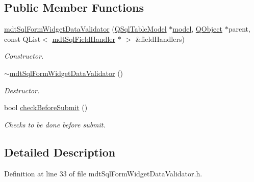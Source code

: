 \subsection*{Public Member Functions}
\begin{DoxyCompactItemize}
\item 
\hyperlink{classmdt_sql_form_widget_data_validator_a3477841cdb2ab659c96ce3363efbadbc}{mdt\-Sql\-Form\-Widget\-Data\-Validator} (\hyperlink{class_q_sql_table_model}{Q\-Sql\-Table\-Model} $\ast$\hyperlink{classmdt_sql_data_validator_a4970687a15ac3c8099c13164fba58291}{model}, \hyperlink{class_q_object}{Q\-Object} $\ast$parent, const Q\-List$<$ \hyperlink{classmdt_sql_field_handler}{mdt\-Sql\-Field\-Handler} $\ast$ $>$ \&field\-Handlers)
\begin{DoxyCompactList}\small\item\em Constructor. \end{DoxyCompactList}\item 
\hyperlink{classmdt_sql_form_widget_data_validator_aec2505ec4b25b1fae3e37cd13f4afe07}{$\sim$mdt\-Sql\-Form\-Widget\-Data\-Validator} ()
\begin{DoxyCompactList}\small\item\em Destructor. \end{DoxyCompactList}\item 
bool \hyperlink{classmdt_sql_form_widget_data_validator_aa577e4acf4d0f371c45a67c18c59a924}{check\-Before\-Submit} ()
\begin{DoxyCompactList}\small\item\em Checks to be done before submit. \end{DoxyCompactList}\end{DoxyCompactItemize}


\subsection{Detailed Description}


Definition at line 33 of file mdt\-Sql\-Form\-Widget\-Data\-Validator.\-h.



